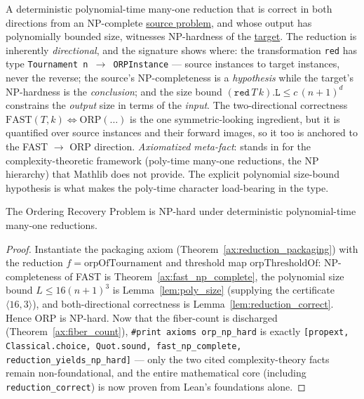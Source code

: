 \begin{theorem}
\label{ax:reduction_packaging}
\leanok
A deterministic polynomial-time many-one reduction that is correct in both
directions from an NP-complete
\href{https://github.com/chinmayhegde/lea-frontier/blob/93d37a15db4cbca0a10870f977b5f223cf04c91f/LeaFrontier/OrderingRecovery/Axioms.lean#L32}{source
problem}, and whose output has polynomially bounded size, witnesses NP-hardness
of the
\href{https://github.com/chinmayhegde/lea-frontier/blob/93d37a15db4cbca0a10870f977b5f223cf04c91f/LeaFrontier/OrderingRecovery/Axioms.lean#L35}{target}.
The reduction is inherently \emph{directional}, and the signature shows where:
the transformation \texttt{red} has type \texttt{Tournament n $\to$ ORPInstance}
--- source instances to target instances, never the reverse; the source's
NP-completeness is a \emph{hypothesis} while the target's NP-hardness is the
\emph{conclusion}; and the size bound $(\mathtt{red}\,T\,k).\mathtt{L} \le
c\,(n+1)^d$ constrains the \emph{output} size in terms of the \emph{input}. The
two-directional correctness $\mathrm{FAST}(T,k) \iff \mathrm{ORP}(\dots)$ is the
one symmetric-looking ingredient, but it is quantified over source instances and
their forward images, so it too is anchored to the FAST $\to$ ORP direction.
\emph{Axiomatized meta-fact}: stands in for the complexity-theoretic framework
(poly-time many-one reductions, the NP hierarchy) that Mathlib does not provide.
The explicit polynomial size-bound hypothesis is what makes the poly-time
character load-bearing in the type.
\end{theorem}

\begin{theorem}
\label{thm:orp_np_hard}
\leanok
{}
The Ordering Recovery Problem is NP-hard under deterministic polynomial-time
many-one reductions.
\end{theorem}
\begin{proof}
\leanok
{}
Instantiate the packaging axiom (Theorem~\ref{ax:reduction_packaging}) with the
reduction $f = \mathrm{orpOfTournament}$ and threshold map $\mathrm{orpThresholdOf}$:
NP-completeness of FAST is Theorem~\ref{ax:fast_np_complete}, the polynomial
size bound $L \le 16(n+1)^3$ is Lemma~\ref{lem:poly_size} (supplying the
certificate $\langle 16,3\rangle$), and both-directional correctness is
Lemma~\ref{lem:reduction_correct}. Hence ORP is NP-hard. Now that the fiber-count
is discharged (Theorem~\ref{ax:fiber_count}), \texttt{\#print axioms
orp\_np\_hard} is exactly \texttt{[propext, Classical.choice, Quot.sound,
fast\_np\_complete, reduction\_yields\_np\_hard]} --- only the two cited
complexity-theory facts remain non-foundational, and the entire mathematical core
(including \texttt{reduction\_correct}) is now proven from Lean's foundations
alone.
\end{proof}
